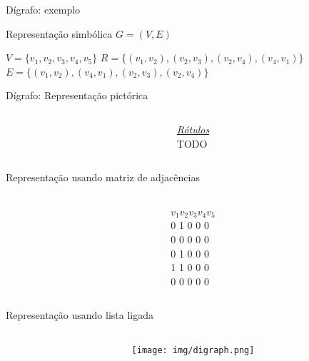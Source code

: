 \documentclass[handout]{beamer}
\begin{document}
\begin{frame}{Dígrafo: exemplo}

\begin{block}{Representação simbólica}
\scriptsize
$G = (V, E)$

$V = \{v_1, v_2, v_3, v_4, v_5\}$
$R = \{(v_1, v_2), (v_2, v_3), (v_2, v_4), (v_4, v_1)\}$
$E  = \{(v_1, v_2), (v_4, v_1), (v_2, v_3), (v_2, v_4)\}$
     
\end{block}

\end{frame}

\begin{frame}{Dígrafo: Representação pictórica}

\begin{columns}
\begin{column}{0.6\textwidth}

\end{column}

\begin{column}{0.35\textwidth}
\scriptsize
\underline{\it Rótulos\/}\\
TODO
\end{column}

\end{columns}

\end{frame}

\begin{frame}{Representação usando matriz de adjacências}

\begin{columns}
\begin{column}{0.6\textwidth}

\end{column}

\begin{column}{0.4\textwidth}
$ v_1  v_2  v_3  v_4  v_5$ \\
 0  1  0  0  0 \\
 0  0  0  0  0 \\
 0  1  0  0  0 \\
 1  1  0  0  0 \\
 0  0  0  0  0 \\
\end{column}
\end{columns}

\end{frame}

\begin{frame}{Representação usando lista ligada}

\begin{columns}
\begin{column}{0.4\textwidth}

\end{column}
\begin{column}{0.6\textwidth}
 \texttt{[image: img/digraph.png]}
\end{column}
\end{columns}

\end{frame}
\end{document}
